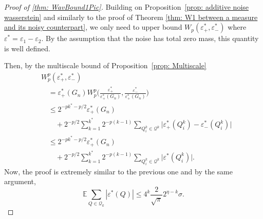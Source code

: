 \documentclass{article}
\theoremstyle{plain}
\theoremstyle{definition}
\theoremstyle{remark}
\begin{document}
\begin{proof}[Proof of \cref{thm: WavBound1Pic}]
Building on  Proposition~\ref{prop: additive noise wasserstein} and similarly to the proof of Theorem \ref{thm: W1 between a measure and its noisy counterpart}, we only need to upper bound 
$W_p(\varepsilon^*_+, \varepsilon^*_-)$ where $\varepsilon^*=\varepsilon_1-\varepsilon_2$. 
By the assumption that the noise has total zero mass, this quantity is well defined. 

 Then, by the multiscale bound of Proposition~\ref{prop: Multiscale}
\begin{align} 
\label{eq: TransportNoise}
    & W_p^p(\varepsilon^*_+, \varepsilon^*_-) \\
    &\quad =  \varepsilon^*_+( G_n)  W_p^p \bigg(\frac{\varepsilon^*_+}{\varepsilon^*_+( G_n)}, \frac{\varepsilon^*_-}{\varepsilon^*_+( G_n)}\bigg) \nonumber \\
    &\quad \le  2^{-pk^* -p/2} \varepsilon^*_+( G_n) \nonumber \\
    &\qquad + 2^{-p/2} \sum_{k=1}^{k^*} 2^{-p(k-1)} \sum _{Q_i^k\in \mathcal{Q}^k} \lvert \varepsilon^*_+(Q_i^k)-\varepsilon^*_-(Q_i^k)  \rvert \nonumber \\
    &\quad \le   2^{-pk^*-p/2} \varepsilon^*_+( G_n) \nonumber \\
    &\qquad + 2^{-p/2} \sum_{k=1}^{k^*} 2^{-p(k-1)} \sum _{Q_i^k\in \mathcal{Q}^k} \lvert \varepsilon^*(Q_i^k)  \rvert. \nonumber
\end{align}
 Now, the proof is extremely similar to the previous one and by the same argument, 
 \begin{equation}
     \mathbb E\sum_{Q\in\mathcal Q_k}|\varepsilon^*(Q)|
     \le 4^k \frac{2}{\sqrt{\pi}}  2^{\eta-k} \sigma.
 \end{equation}


\end{proof}
\end{document}
